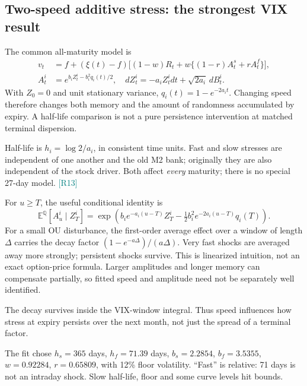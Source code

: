 \documentclass[11pt,a4paper]{article}
\newcommand{\E}{\mathbb E^{\mathbb Q}}
\newcommand{\src}[1]{\textcolor{teal}{\small[#1]}}
\begin{document}
\subsection{Two-speed additive stress: the strongest VIX result}
The common all-maturity model is
\begin{align}\label{eq:two}
v_t&=f+(\xi(t)-f)\big[(1-w)R_t+w\{(1-r)A_t^s+rA_t^f\}\big],\\
A_t^i&=e^{b_iZ_t^i-b_i^2q_i(t)/2},\quad
dZ_t^i=-a_iZ_t^idt+\sqrt{2a_i}\,dB_t^i.
\end{align}
With $Z_0=0$ and unit stationary variance, $q_i(t)=1-e^{-2a_it}$. Changing speed therefore changes both memory and the amount of randomness accumulated by expiry. A half-life comparison is not a pure persistence intervention at matched terminal dispersion.

Half-life is $h_i=\log2/a_i$, in consistent time units. Fast and slow stresses are independent of one another and the old M2 bank; originally they are also independent of the stock driver. Both affect \emph{every} maturity; there is no special 27-day model. \src{R13}

For $u\geq T$, the useful conditional identity is
\begin{equation}
\E[A_u^i\mid Z_T^i]
=\exp\!\left(b_ie^{-a_i(u-T)}Z_T^i
-\tfrac12 b_i^2e^{-2a_i(u-T)}q_i(T)\right).
\end{equation}
For a small OU disturbance, the first-order average effect over a window of length $\Delta$ carries the decay factor $(1-e^{-a\Delta})/(a\Delta)$. Very fast shocks are averaged away more strongly; persistent shocks survive. This is linearized intuition, not an exact option-price formula. Larger amplitudes and longer memory can compensate partially, so fitted speed and amplitude need not be separately well identified.

The decay survives inside the VIX-window integral. Thus speed influences how stress at expiry persists over the next month, not just the spread of a terminal factor.

The fit chose $h_s=365$ days, $h_f=71.39$ days, $b_s=2.2854$, $b_f=3.5355$, $w=0.92284$, $r=0.65809$, with 12\% floor volatility. ``Fast'' is relative: 71 days is not an intraday shock. Slow half-life, floor and some curve levels hit bounds.
\end{document}

